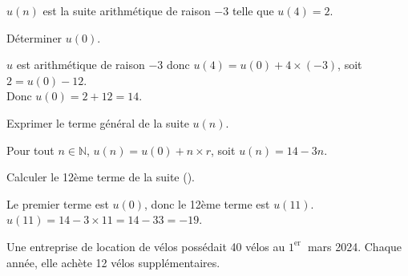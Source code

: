 \documentclass[11pt,a4paper]{article}  %
\begin{document}
\exerciceDS{}
$u(n)$ est la suite arithmétique de raison $-3$ telle que $u(4)=2$.
\begin{enumMet}
	\item Déterminer $u(0)$.
	\par
	\begin{corrBox}
		$u$ est arithmétique de raison $-3$ donc $u(4)=u(0)+4\times(-3)$, soit $2=u(0)-12$.\\
		Donc $u(0)=2+12=14$.
	\end{corrBox}

	\item Exprimer le terme général de la suite $u(n)$.
	\par
	\begin{corrBox}
		Pour tout $n\in\mathbb{N}$, $u(n)=u(0)+n\times r$, soit $u(n)=14-3n$.
	\end{corrBox}

	\item Calculer le 12ème terme de la suite (\danger).
	\par
	\begin{corrBox}
		Le premier terme est $u(0)$, donc le 12ème terme est $u(11)$.\\
		$u(11)=14-3\times 11=14-33=-19$.
	\end{corrBox}
\end{enumMet}


\exerciceDS{}
Une entreprise de location de vélos possédait 40 vélos au $1^{\text {er }}$ mars 2024. Chaque année, elle achète 12 vélos supplémentaires.
\end{document}
